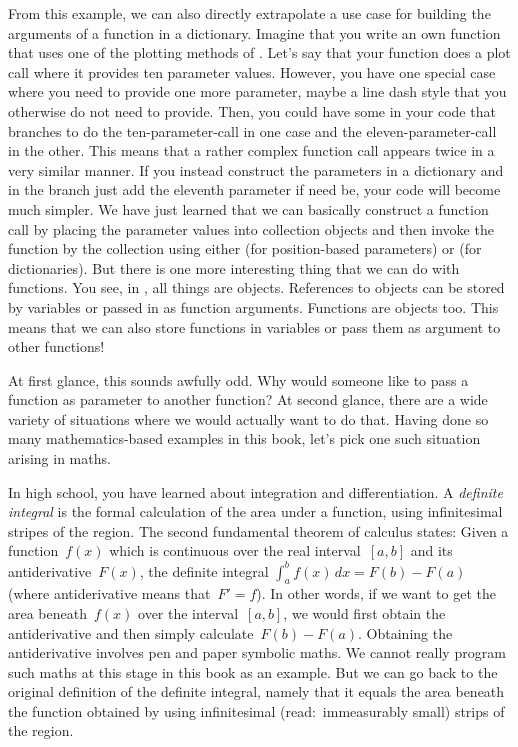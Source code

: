 From this example, we can also directly extrapolate a use case for building the arguments of a function in a dictionary.
Imagine that you write an own function that uses one of the plotting methods of \matplotlib.
Let's say that your function does a plot call where it provides ten parameter values.
However, you have one special case where you need to provide one more parameter, maybe a line dash style that you otherwise do not need to provide.
Then, you could have some  in your code that branches to do the ten-parameter-call in one case and the eleven-parameter-call in the other.
This means that a rather complex function call appears twice in a very similar manner.
If you instead construct the parameters in a dictionary and in the  branch just add the eleventh parameter if need be, your code will become much simpler.%
%
\FloatBarrier%
\endhsection%
%
%
\label{sec:functionsAsVarsAndLambdas}%
%
We have just learned that we can basically construct a function call by placing the parameter values into collection objects and then invoke the function by  the collection using either \pythonil{*} (for position-based parameters) or \pythonil{**} (for dictionaries).
But there is one more interesting thing that we can do with functions.
You see, in \python, all things are objects.
References to objects can be stored by variables or passed in as function arguments.
Functions are objects too.
This means that we can also store functions in variables or pass them as argument to other functions!

At first glance, this sounds awfully odd.
Why would someone like to pass a function as parameter to another function?
At second glance, there are a wide variety of situations where we would actually want to do that.
Having done so many mathematics-based examples in this book, let's pick one such situation arising in maths.

In high school, you have learned about integration and differentiation.
A \emph{definite integral} is the formal calculation of the area under a function, using infinitesimal stripes of the region.
The second fundamental theorem of calculus states:
Given a function~$f(x)$ which is continuous over the real interval~$[a,b]$ and its antiderivative~$F(x)$, the definite integral $\int_a^b f(x)\,dx = F(b)-F(a)$ (where antiderivative means that~$F'=f$).
In other words, if we want to get the area beneath~$f(x)$ over the interval~$[a,b]$, we would first obtain the antiderivative and then simply calculate~$F(b)-F(a)$.
Obtaining the antiderivative involves pen and paper symbolic maths.
We cannot really program such maths at this stage in this book as an example.
But we can go back to the original definition of the definite integral, namely that it equals the area beneath the function obtained by using infinitesimal (read:~immeasurably small) strips of the region.


